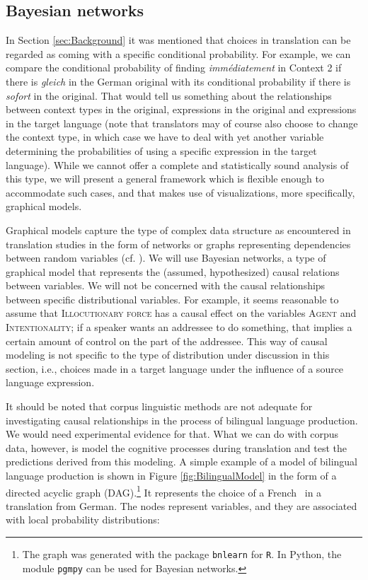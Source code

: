 

\subsection{Bayesian networks}\label{sec:GraphicalModels}

In Section \ref{sec:Background} it was mentioned that choices in translation
can be regarded as coming with a specific conditional probability.
%
For example, we can compare the conditional probability of finding
\textit{immédiatement} in Context 2 if there is
\textit{gleich} in the German original with its conditional
probability if there is \textit{sofort} in the original. That
would tell us something about the relationships between context types in
the original, expressions in the original and expressions in the
target language (note that translators may of course also choose to
change the context type, in which case we have to deal with yet
another variable determining the probabilities of using a specific
expression in the target language). While we cannot offer a complete
and statistically sound analysis of this type, we will present a
general framework which is flexible enough to accommodate such cases,
and that makes use of visualizations, more specifically, graphical models.

Graphical models capture the type of complex data structure as
encountered in translation studies in the form of networks or graphs
representing dependencies between random variables
(cf. \citealt{KollerFriedman2009}). We will use Bayesian networks, a
type of graphical model that represents the (assumed, hypothesized)
causal relations between variables. We will not be concerned with the
causal relationships between specific distributional variables. For
example, it seems reasonable to assume that \textsc{Illocutionary
  force} has a causal effect on the variables \textsc{Agent} and
\textsc{Intentionality}; if a speaker wants an addressee to do
something, that implies a certain amount of control on the part of the
addressee. This way of causal modeling is not specific to the type of
distribution under discussion in this section, i.e., choices made in a
target language under the influence of a source language expression.
 
It should be noted that corpus linguistic methods are not adequate for
investigating causal relationships in the process of bilingual
language production. We would need experimental evidence for
that. What we can do with corpus data, however, is model the cognitive
processes during translation and test the predictions derived from
this modeling. A simple example of a model of bilingual
language production is shown in Figure \ref{fig:BilingualModel} in the
form of a directed acyclic graph (DAG).\footnote{The graph was
  generated with the package \verb+bnlearn+ for \verb+R+. In Python,
  the module \verb+pgmpy+ can be used for Bayesian networks.} It represents the
choice of a French \ipadv\ in a translation from German. The nodes
represent variables, and they are associated with local probability
distributions:

